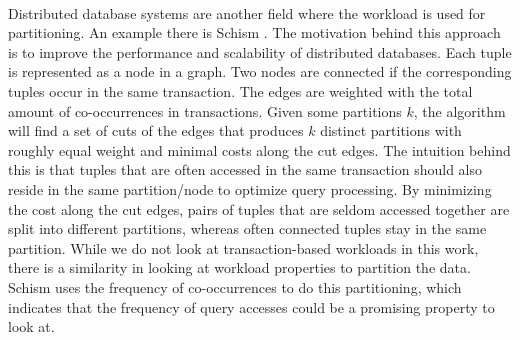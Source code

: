\paragraph{}
Distributed database systems are another field where the workload is used for partitioning. An example there is Schism \cite{Curino2010}. The motivation behind this approach is to improve the performance and scalability of distributed databases. Each tuple is represented as a node in a graph. Two nodes are connected if the corresponding tuples occur in the same transaction. The edges are weighted with the total amount of co-occurrences in transactions. Given some partitions $k$, the algorithm will ﬁnd a set of cuts of the edges that produces $k$ distinct partitions with roughly equal weight and minimal costs along the cut edges. The intuition behind this is that tuples that are often accessed in the same transaction should also reside in the same partition/node to optimize query processing. By minimizing the cost along the cut edges, pairs of tuples that are seldom accessed together are split into diﬀerent partitions, whereas often connected tuples stay in the same partition. While we do not look at transaction-based workloads in this work, there is a similarity in looking at workload properties to partition the data. Schism uses the frequency of co-occurrences to do this partitioning, which indicates that the frequency of query accesses could be a promising property to look at.
